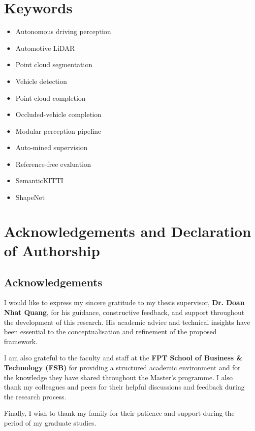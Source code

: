 \documentclass[a4paper,12pt]{report}
\begin{document}
\chapter*{Keywords}
\begin{itemize}\setlength{\itemsep}{2pt}
  \item Autonomous driving perception
  \item Automotive LiDAR
  \item Point cloud segmentation
  \item Vehicle detection
  \item Point cloud completion
  \item Occluded-vehicle completion
  \item Modular perception pipeline
  \item Auto-mined supervision
  \item Reference-free evaluation
  \item SemanticKITTI
  \item ShapeNet
\end{itemize}
\clearpage


\chapter*{Acknowledgements and Declaration of Authorship}

\section*{Acknowledgements}
I would like to express my sincere gratitude to my thesis supervisor, \textbf{Dr. Doan Nhat Quang}, for his guidance, constructive feedback, and support throughout the development of this research. His academic advice and technical insights have been essential to the conceptualisation and refinement of the proposed framework.

I am also grateful to the faculty and staff at the \textbf{FPT School of Business \& Technology (FSB)} for providing a structured academic environment and for the knowledge they have shared throughout the Master's programme. I also thank my colleagues and peers for their helpful discussions and feedback during the research process.

Finally, I wish to thank my family for their patience and support during the period of my graduate studies.
\end{document}
